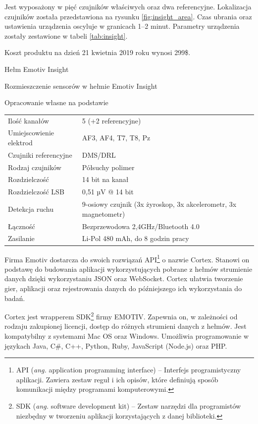 \documentclass[skorowidz,skroty]{dyplomWEZUT}
\begin{document}
Jest wyposażony w pięć czujników właściwych oraz dwa referencyjne. Lokalizacja czujników została przedstawiona na rysunku \vref{fig:insight_area}. Czas ubrania oraz ustawienia urządzenia oscyluje w granicach 1--2 minut. Parametry urządzenia zostały zestawione w tabeli \vref{tab:insight}.

Koszt produktu na dzień 21 kwietnia 2019 roku wynosi 299\$.

{Hełm Emotiv Insight\label{fig:insight}}
{\cite{emotiv_insight}}

{Rozmieszczenie sensorów w hełmie Emotiv Insight\label{fig:insight_area}}
{\cite{emotiv_insight}}

{Opracowanie własne na podstawie \cite{emotiv_comparison}}
{
    \begin{tabular}{l|l}
        Ilość kanałów & 5 (+2 referencyjne)\\
        Umiejscowienie elektrod & AF3, AF4, T7, T8, Pz\\
        Czujniki referencyjne & DMS/DRL\\
        Rodzaj czujników & Półsuchy polimer\\
        Rozdzielczość & 14 bit na kanał\\
        Rozdzielczość LSB & 0,51 µV @ 14 bit\\
        Detekcja ruchu & 9-osiowy czujnik (3x żyroskop, 3x akcelerometr, 3x magnetometr)\\
        Łączność & Bezprzewodowa 2,4GHz/Bluetooth 4.0\\
        Zasilanie & Li-Pol 480 mAh, do 8 godzin pracy
    \end{tabular}
}

Firma Emotiv dostarcza do swoich rozwiązań API\footnote{API (\textit{ang.} application programming interface) -- Interfejs programistyczny aplikacji. Zawiera zestaw reguł i ich opisów, które definiują sposób komunikacji między programami komputerowymi.\label{foot:api}} o nazwie Cortex. Stanowi on podstawę do budowania aplikacji wykorzystujących pobrane z hełmów strumienie danych dzięki wykorzystaniu JSON oraz WebSocket\cite{emotiv_developer}. Cortex ułatwia tworzenie gier, aplikacji oraz rejestrowania danych do późniejszego ich wykorzystania do badań.

Cortex jest wrapperem SDK\footnote{SDK (\textit{ang.} software development kit) -- Zestaw narzędzi dla programistów niezbędny w tworzeniu aplikacji korzystających z danej biblioteki.\label{foot:sdk}} firmy EMOTIV. Zapewnia on, w zależności od rodzaju zakupionej licencji, dostęp do różnych strumieni danych z hełmów. Jest kompatybilny z systemami Mac OS oraz Windows. Umożliwia programowanie w językach Java, C\#, C++, Python, Ruby, JavaScript (Node.js) oraz PHP.
\end{document}
